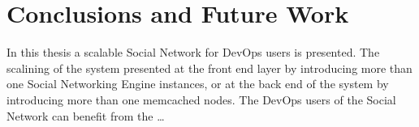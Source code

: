 \chapter{Conclusions and Future Work}
In this thesis a scalable Social Network for DevOps users is presented. The scalining of the system presented at the front end layer by introducing more than one Social Networking Engine instances, or at the back end of the system by introducing more than one memcached nodes. The DevOps users of the Social Network can benefit from the \ldots